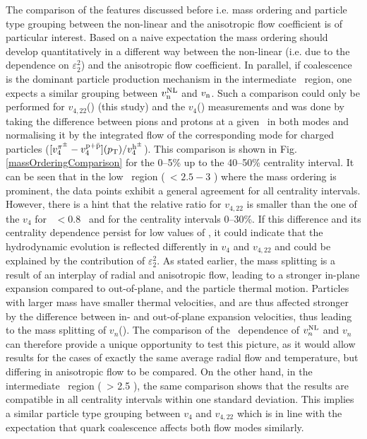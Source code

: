 The comparison of the features discussed before i.e. mass ordering and particle type grouping between the non-linear and the anisotropic flow coefficient is of particular interest.  Based on a naive expectation the mass ordering should develop quantitatively in a different way between the non-linear (i.e. due to the dependence on $\varepsilon_{2}^{2}$) and the anisotropic flow coefficient. In parallel, if coalescence is the dominant particle production mechanism in the intermediate \pT~region, one expects a similar grouping between $v_{\rm n}^{\rm NL}$ and $v_{\rm n}$. Such a comparison could only be performed for $v_{4,22}$(\pT) (this study) and the $v_{4}$(\pT) measurements \cite{Acharya:2018zuq} and was done by taking the difference between pions and protons at a given \pT~in both modes and normalising it by the integrated flow of the corresponding mode for charged particles \cite{Adam:2016izf} ($[v_{4}^{\pi^{\pm}} -  v_{4}^{\rm p+\bar{p}}](p_{\rm T}) / v_{4}^{\rm h^{\pm}}$). This comparison is shown in Fig. \ref{massOrderingComparison} for the 0--5\% up to the 40--50\% centrality interval. It can be seen that in the low \pT~region (\pT~< $2.5-3$ \GeV) where the mass ordering is prominent, the data points exhibit a general agreement for all centrality intervals. However, there is a hint that the relative ratio for $v_{4,22}$ is smaller than the one of the $v_{4}$ for \pT~$< 0.8$ \GeV~and for the centrality intervals 0--30\%.
 If this difference and its centrality dependence persist for low values of \pT, it could indicate that the hydrodynamic evolution is reflected differently in $v_{4}$ and $v_{4,22}$ and could be explained by the contribution of $\varepsilon_{2}^{2}$.  As stated earlier, the mass splitting is a result of an interplay of radial and anisotropic flow, leading to a stronger in-plane expansion compared to out-of-plane, and the particle thermal motion. Particles with larger mass have smaller thermal velocities, and are thus affected stronger by the difference between in- and out-of-plane expansion velocities, thus leading to the mass splitting of $v_{n}$(\pT). The comparison of the \pT~dependence of $v_{n}^{\rm NL}$ and $v_{n}$ can therefore provide a unique opportunity to test this picture, as it would allow results for the cases of exactly the same average radial flow and temperature, but differing in anisotropic flow to be compared. On the other hand, in the intermediate \pT~region (\pT~> 2.5 \GeV), the same comparison shows that the results are compatible in all centrality intervals within one standard deviation. This implies a similar particle type grouping between $v_{4}$ and $v_{4,22}$ which is in line with the expectation that quark coalescence affects both flow modes  similarly.

